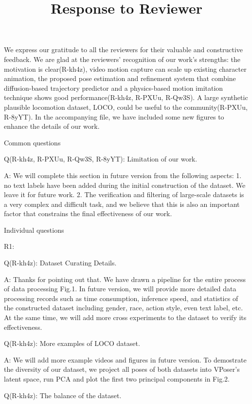 \documentclass{article}
\title{Response to Reviewer}
\begin{document}
\maketitle


We express our gratitude to all the reviewers for their valuable and constructive feedback. We are glad at the reviewers’ recognition of our work's strengths: the motivation is clear(R-kh4z), video motion capture can scale up existing character animation, the proposed pose estimation and refinement system that combine diffusion-based trajectory predictor and a physics-based motion imitation technique shows good performance(R-kh4z, R-PXUu, R-Qw3S). A large synthetic plausible locomotion dataset, LOCO, could be useful to the community(R-PXUu, R-8yYT).
In the accompanying file, we have included some new figures to enhance the details of our work.

Common questions

Q(R-kh4z, R-PXUu, R-Qw3S, R-8yYT): Limitation of our work.

A: We will complete this section in future version from the following aspects: 1. no text labels have been added during the initial construction of the dataset. We leave it for future work. 2. The verification and filtering of large-scale datasets is a very complex and difficult task, and we believe that this is also an important factor that constrains the final effectiveness of our work.

Individual questions

R1:

Q(R-kh4z): Dataset Curating Details.

A: Thanks for pointing out that. We have drawn a pipeline for the entire process of data processing Fig.1. In future version, we will provide more detailed data processing records such as time consumption, inference speed, and statistics of the constructed dataset including gender, race, action style, even text label, etc. At the same time, we will add more cross experiments to the dataset to verify its effectiveness.

Q(R-kh4z): More examples of LOCO dataset.

A: We will add more example videos and figures in future version. To demostrate the diversity of our dataset, we project all poses of both datasets into VPoser’s latent space, run PCA and plot the first two principal components in Fig.2.

Q(R-kh4z): The balance of the dataset.
\end{document}
